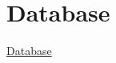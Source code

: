 \section{Database}\label{database}

\href{Database\%200b2662093a08491c827ab085551db575.csv}{Database}
